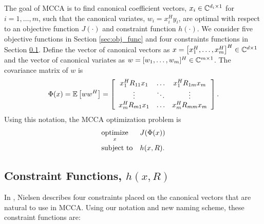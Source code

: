 The goal of MCCA is to find canonical coefficient vectors, $x_i\in\mathbb{C}^{d_i\times 1}$
for $i=1,\dots,m$, such that the canonical variates, $w_i=x_i^Hy_i$, are optimal with
respect to an objective function $J(\cdot)$ and constraint function $h(\cdot)$. We
consider five objective functions \cite{kettenring1971canonical} in Section
\ref{sec:obj_func} and four constraints functions \cite{nielsen1994analysis} in Section
\ref{sec:constraints}. Define the vector of canonical vectors as
$x=\left[x_1^H,\dots,x_m^H\right]^H\in\mathbb{C}^{d\times 1}$ and the vector of canonical
variates as $w=[w_1,\dots,w_m]^H\in\mathbb{C}^{m\times 1}$. The covariance matrix of $w$ is
\begin{equation*}
\Phi(x)=\mathbb{E}\left[{ww^H}\right]=\left[\begin{array}{ccc} x_1^HR_{11}x_1 & \dots & x_1^HR_{1m}x_m \\ \vdots
    & \ddots & \vdots \\ x_m^HR_{m1}x_1 & \dots & x_m^HR_{mm}x_m\\ \end{array}\right].
\end{equation*}
Using this notation, the MCCA optimization problem is
\begin{equation}\label{eq:chpt10:opt_prob}
\begin{aligned}
&\underset{x}{\mathop{\rm optimize}} && J(\Phi(x))\\
&\text{subject to} && h(x,R).\\
\end{aligned}
\end{equation}

\subsection{Constraint Functions, $h(x,R)$}\label{sec:constraints}
In \cite{nielsen2002multiset,nielsen1994analysis}, Nielsen describes four constraints
placed on the canonical vectors that are natural to use in MCCA. Using our notation and
new naming scheme, these constraint functions are:

